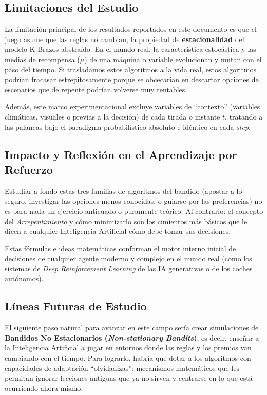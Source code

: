 \subsection{Limitaciones del Estudio}\label{limitaciones-del-estudio}

La limitación principal de los resultados reportados en este documento
es que el juego asume que las reglas no cambian, la propiedad de
\textbf{estacionalidad} del modelo K-Brazos abstraído. En el mundo real,
la característica estocástica y las medias de recompensa (\(\mu\)) de
una máquina o variable evolucionan y mutan con el paso del tiempo. Si
trasladamos estos algoritmos a la vida real, estos algoritmos podrían
fracasar estrepitosamente porque se obcecarían en descartar opciones de
escenarios que de repente podrían volverse muy rentables.

Además, este marco experimentacional excluye variables de ``contexto''
(variables climáticas, visuales o previas a la decisión) de cada tirada
o instante \(t\), tratando a las palancas bajo el paradigma
probabilístico absoluto e idéntico en cada \emph{step}.

\subsection{Impacto y Reflexión en el Aprendizaje por
Refuerzo}\label{impacto-y-reflexiuxf3n-en-el-aprendizaje-por-refuerzo}

Estudiar a fondo estas tres familias de algoritmos del bandido (apostar
a lo seguro, investigar las opciones menos conocidas, o guiarse por las
preferencias) no es para nada un ejercicio anticuado o puramente
teórico. Al contrario: el concepto del \emph{Arrepentimiento} y cómo
minimizarlo son los cimientos más básicos que le dicen a cualquier
Inteligencia Artificial cómo debe tomar sus decisiones.

Estas fórmulas e ideas matemáticas conforman el motor interno inicial de
decisiones de cualquier agente moderno y complejo en el mundo real (como
los sistemas de \emph{Deep Reinforcement Learning} de las IA generativas
o de los coches autónomos).

\subsection{Líneas Futuras de
Estudio}\label{luxedneas-futuras-de-estudio}

El siguiente paso natural para avanzar en este campo sería crear
simulaciones de \textbf{Bandidos No Estacionarios (\emph{Non-stationary
Bandits})}, es decir, enseñar a la Inteligencia Artificial a jugar en
entornos donde las reglas y los premios van cambiando con el tiempo.
Para lograrlo, habría que dotar a los algoritmos con capacidades de
adaptación ``olvidadizas'': mecanismos matemáticos que les permitan
ignorar lecciones antiguas que ya no sirven y centrarse en lo que está
ocurriendo ahora mismo.

